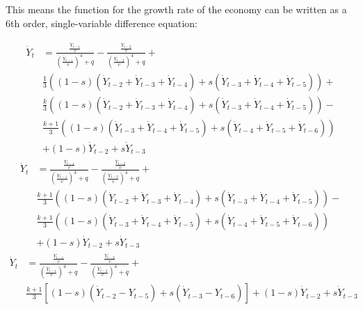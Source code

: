 This means the function for the growth rate of the economy can be written as a 6th order, single-variable difference equation:

\begin{equation*}
\begin{split}
    \dot Y_{t}& = \frac{\frac{\dot Y_{t-1}}{v}}{\left(\frac{\dot Y_{t-1}}{v}\right)^4+q}-\frac{\frac{\dot Y_{t-2}}{v}}{\left(\frac{\dot Y_{t-2}}{v}\right)^4+q} + \\
    & \frac{1}{3}\left((1-s)(\dot Y_{t-2}+\dot Y_{t-3}+\dot Y_{t-4})+s(\dot Y_{t-3}+\dot Y_{t-4}+\dot Y_{t-5})\right) + \\
    &\frac{k}{3}\left((1-s)(\dot Y_{t-2}+\dot Y_{t-3}+\dot Y_{t-4})+s(\dot Y_{t-3}+\dot Y_{t-4}+\dot Y_{t-5})\right)-\\
    &\frac{k+1}{3}\left((1-s)(\dot Y_{t-3}+\dot Y_{t-4}+\dot Y_{t-5})+s(\dot Y_{t-4}+\dot Y_{t-5}+\dot Y_{t-6})\right)\\
    &+(1-s)\dot Y_{t-2}+s\dot Y_{t-3}
\end{split}
\end{equation*}
\begin{equation*}
    \begin{split}
        \dot Y_{t}& = \frac{\frac{\dot Y_{t-1}}{v}}{\left(\frac{\dot Y_{t-1}}{v}\right)^4+q}-\frac{\frac{\dot Y_{t-2}}{v}}{\left(\frac{\dot Y_{t-2}}{v}\right)^4+q} + \\
        & \frac{k+1}{3}\left((1-s)(\dot Y_{t-2}+\dot Y_{t-3}+\dot Y_{t-4})+s(\dot Y_{t-3}+\dot Y_{t-4}+\dot Y_{t-5})\right) -\\
        &\frac{k+1}{3}\left((1-s)(\dot Y_{t-3}+\dot Y_{t-4}+\dot Y_{t-5})+s(\dot Y_{t-4}+\dot Y_{t-5}+\dot Y_{t-6})\right)\\
        &+(1-s)\dot Y_{t-2}+s\dot Y_{t-3}
    \end{split}
    \end{equation*}
\begin{equation}
\begin{split}
    \dot Y_{t}& = \frac{\frac{\dot Y_{t-1}}{v}}{\left(\frac{\dot Y_{t-1}}{v}\right)^4+q}-\frac{\frac{\dot Y_{t-2}}{v}}{\left(\frac{\dot Y_{t-2}}{v}\right)^4+q} + \\
    & \frac{k+1}{3}\left[(1-s)(\dot Y_{t-2}-Y_{t-5})+s(\dot Y_{t-3}-Y_{t-6})\right]+(1-s)\dot Y_{t-2}+s\dot Y_{t-3}
\end{split}
\end{equation}

